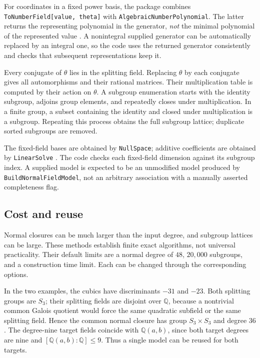 \documentclass[11pt,a4paper]{article}
\theoremstyle{definition}\newtheorem{definition}[theorem]{Definition}
\theoremstyle{remark}\newtheorem{remark}[theorem]{Remark}
\newcommand{\Q}{\mathbb{Q}}\newcommand{\C}{\mathbb{C}}
\newcommand{\code}[1]{\texttt{#1}}
\begin{document}
For coordinates in a fixed power basis, the package combines \code{ToNumberField[value, theta]} with \code{AlgebraicNumberPolynomial}. The latter returns the representing polynomial in the generator, \emph{not} the minimal polynomial of the represented value \cite{anpoly}. A nonintegral supplied generator can be automatically replaced by an integral one, so the code uses the returned generator consistently and checks that subsequent representations keep it.

Every conjugate of $\theta$ lies in the splitting field. Replacing $\theta$ by each conjugate gives all automorphisms and their rational matrices. Their multiplication table is computed by their action on $\theta$. A subgroup enumeration starts with the identity subgroup, adjoins group elements, and repeatedly closes under multiplication. In a finite group, a subset containing the identity and closed under multiplication is a subgroup. Repeating this process obtains the full subgroup lattice; duplicate sorted subgroups are removed.

The fixed-field bases are obtained by \code{NullSpace}; additive coefficients are obtained by \code{LinearSolve} \cite{linearalgebra}. The code checks each fixed-field dimension against its subgroup index. A supplied model is expected to be an unmodified model produced by \code{BuildNormalFieldModel}, not an arbitrary association with a manually asserted completeness flag.

\subsection{Cost and reuse}
Normal closures can be much larger than the input degree, and subgroup lattices can be large. These methods establish finite exact algorithms, not universal practicality. Their default limits are a normal degree of $48$, $20{,}000$ subgroups, and a construction time limit. Each can be changed through the corresponding options.

In the two examples, the cubics have discriminants $-31$ and $-23$. Both splitting groups are $S_3$; their splitting fields are disjoint over $\Q$, because a nontrivial common Galois quotient would force the same quadratic subfield or the same splitting field. Hence the common normal closure has group $S_3\times S_3$ and degree $36$. The degree-nine target fields coincide with $\Q(a,b)$, since both target degrees are nine and $[\Q(a,b):\Q]\leq9$. Thus a single model can be reused for both targets.
\end{document}
